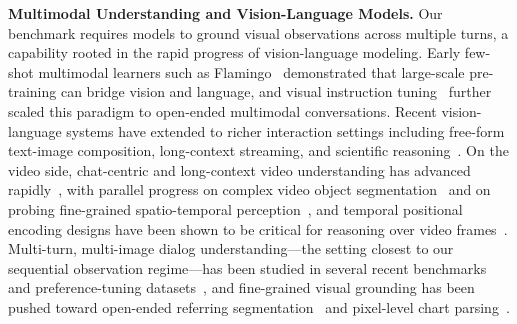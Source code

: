 \documentclass{llmxive}
\begin{document}
\noindent\textbf{Multimodal Understanding and Vision-Language Models.}
Our benchmark requires models to ground visual observations across multiple turns, a capability rooted in the rapid progress of vision-language modeling. Early few-shot multimodal learners such as Flamingo~\citep{alayrac2022flamingo} demonstrated that large-scale pre-training can bridge vision and language, and visual instruction tuning~\citep{liu2023llava} further scaled this paradigm to open-ended multimodal conversations. Recent vision-language systems have extended to richer interaction settings including free-form text-image composition, long-context streaming, and scientific reasoning~\citep{wxl_dong2024internlmxcomposer2,wxl_zhang2024omnilive,wxl_zou2026interns1pro}. On the video side, chat-centric and long-context video understanding has advanced rapidly~\citep{li2023videochat,wxl_chen2024sharegpt4video,wu2024longvideobench,fang2024mmbench, chen2025iwr}, with parallel progress on complex video object segmentation~\citep{zhang2026sec} and on probing fine-grained spatio-temporal perception~\citep{liu2026starbench}, and temporal positional encoding designs have been shown to be critical for reasoning over video frames~\citep{wxl_wei2025videorope}. Multi-turn, multi-image dialog understanding---the setting closest to our sequential observation regime---has been studied in several recent benchmarks and preference-tuning datasets~\citep{wxl_liu2024mmdu,ma2024mmlongbench,liu2025miadpo}, and fine-grained visual grounding has been pushed toward open-ended referring segmentation~\citep{zhang2026setcon} and pixel-level chart parsing~\citep{li2026visualselfrefine}.
\end{document}

